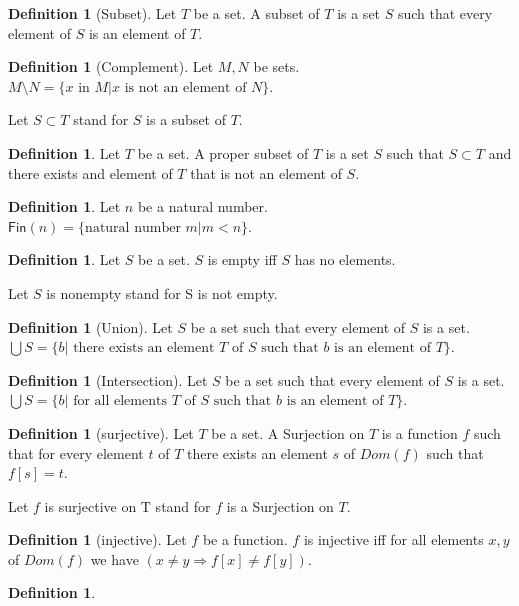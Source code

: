 \documentclass[10pt]{article}
\newenvironment{forthel}{\begin{leftbar}}{\end{leftbar}}
\newcommand{\Fin}{\mathsf{Fin}}
\theoremstyle{definition}
\newtheorem{definition}[theorem]{Definition}
\theoremstyle{plain}
\theoremstyle{remark}
\begin{document}
\begin{forthel}
	\begin{definition}[Subset]
		Let $T$ be a set. A subset of $T$ is a set $S$ such that every element of $S$ is an element of $T$.
	\end{definition}
	\begin{definition}[Complement]
		Let $M,N$ be sets. $M\setminus N = \{x \text{ in }M | x \text{ is not an element of }N\}$.
	\end{definition}
	Let $S\subset T$ stand for $S$ is a subset of $T$.
	\begin{definition}
		Let $T$ be a set. A proper subset of $T$ is a set $S$ such that $S\subset T$ and there exists and element of $T$ that is not an element of $S$.
	\end{definition}
	\begin{definition}
		Let $n$ be a natural number. $\Fin(n) = \{\text{natural number }m | m < n\}$.
	\end{definition}
	\begin{definition}
		Let $S$ be a set. $S$ is empty iff $S$ has no elements.
	\end{definition}
	Let $S$ is nonempty stand for S is not empty.
	\begin{definition}[Union]
		Let $S$ be a set such that every element of $S$ is a set. \\
		$\bigcup S = \{b |\text{ there exists an element }T\text{ of }S\text{ such that }b\text{ is an element of }T \}$.
	\end{definition}
	\begin{definition}[Intersection]
		Let $S$ be a set such that every element of $S$ is a set. \\
		$\bigcup S = \{b |\text{ for all elements }T\text{ of }S\text{ such that }b\text{ is an element of }T \}$.
	\end{definition}
	\begin{definition}[surjective]
		Let $T$ be a set. A Surjection on $T$ is a function $f$ such that for every element $t$ of $T$ there exists an element $s$ of $Dom(f)$ such that $f[s]=t$.
	\end{definition}
	Let $f$ is surjective on T stand for $f$ is a Surjection on $T$.
	\begin{definition}[injective]
		Let $f$ be a function. $f$ is injective iff for all elements $x,y$ of $Dom(f)$ we have $(x \neq y \Rightarrow f[x] \neq f[y])$.
	\end{definition}
	\begin{definition}

\end{definition}
\end{forthel}
\end{document}
